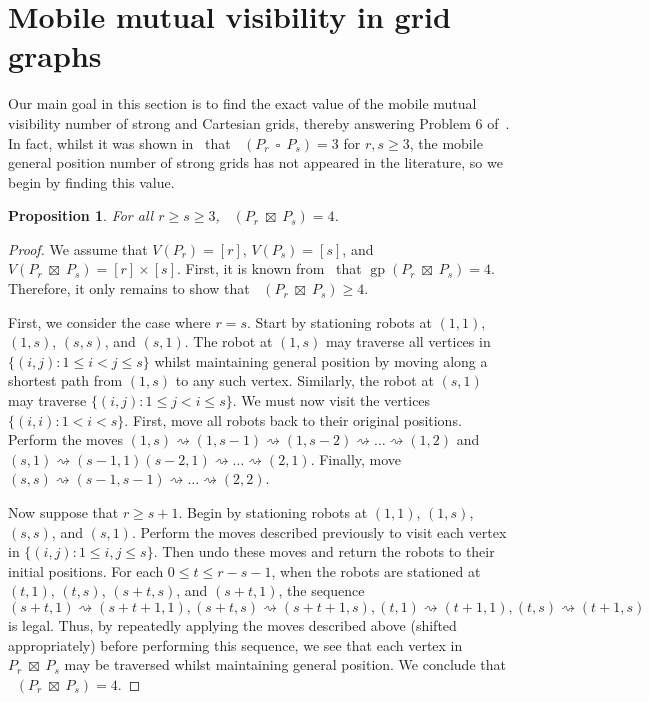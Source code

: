 \documentclass[a4paper,12pt]{article}
\DeclareMathOperator{\strongprod}{\,\boxtimes\,}
\DeclareMathOperator{\mob}{Mob_{gp}}
\DeclareMathOperator{\gp}{gp}
\DeclareMathOperator{\cp}{\,\square\,}
\newtheorem{proposition}[theorem]{Proposition}
\theoremstyle{definition}
\newcommand{\move}{\rightsquigarrow}
\begin{document}
	
	
	
	
	\section{Mobile mutual visibility in grid graphs}\label{sec:grid graph}
	
	Our main goal in this section is to find the exact value of the mobile mutual visibility number of strong and Cartesian grids, thereby answering Problem 6 of~\cite{dettlaff2024}. In fact, whilst it was shown in~\cite{Cartesian} that $\mob (P_r \cp P_s) = 3$ for $r,s \geq 3$, the mobile general position number of strong grids has not appeared in the literature, so we begin by finding this value.
	
	
	\begin{proposition}
		For all $r \geq s \geq 3$, $\mob(P_r \strongprod P_s) = 4$.
	\end{proposition}
	\begin{proof}
		We assume that $V(P_r) = [r]$, $V(P_s) = [s]$, and $V(P_r \strongprod P_s) = [r] \times [s]$. First, it is known from~\cite[Section 4]{Klavzar-2019} that $\gp(P_r \strongprod P_s) = 4$. Therefore, it only remains to show that $\mob(P_r \strongprod P_s) \geq 4$.
		
		First, we consider the case where $r=s$. Start by stationing robots at $(1,1)$, $(1,s)$, $(s,s)$, and $(s,1)$. The robot at $(1,s)$ may traverse all vertices in $\{ (i,j) : 1 \leq i < j \leq s \}$ whilst maintaining general position by moving along a shortest path from $(1,s)$ to any such vertex. Similarly, the robot at $(s,1)$ may traverse $\{ (i,j) : 1 \leq j < i \leq s \}$. We must now visit the vertices $\{ (i,i) : 1 < i < s \}$. First, move all robots back to their original positions. Perform the moves $(1,s) \move (1, s-1) \move (1, s-2) \move \dots \move (1,2)$ and  $(s,1) \move (s-1, 1) (s-2, 1) \move \dots \move (2,1)$. Finally, move $(s,s) \move (s-1, s-1) \move \dots \move (2,2)$.
		
		Now suppose that $r \geq s+1$. Begin by stationing robots at $(1,1)$, $(1,s)$, $(s,s)$, and $(s,1)$. Perform the moves described previously to visit each vertex in $\{ (i,j) : 1 \leq i, j \leq s \}$. Then undo these moves and return the robots to their initial positions. For each $0 \leq t \leq r-s-1$, when the robots are stationed at $(t,1)$, $(t,s)$, $(s+t,s)$, and $(s+t, 1)$, the sequence \[(s+t,1) \move (s+t+1, 1), (s+t, s) \move (s+t+1, s), (t, 1) \move (t+1, 1), (t, s) \move (t+1, s)\] is legal. Thus, by repeatedly applying the moves described above (shifted appropriately) before performing this sequence, we see that each vertex in $P_r \strongprod P_s$ may be traversed whilst maintaining general position. We conclude that $\mob(P_r \strongprod P_s) = 4$.
	\end{proof}
	
\end{document}

